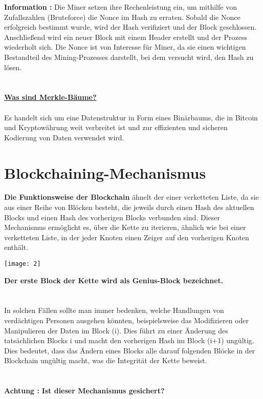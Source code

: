 \documentclass[ngerman]{scrreprt}
\begin{document}
\color{green}
\Large{\textbf{Information :}} 
\color{black}
\normalsize
Die Miner setzen ihre Rechenleistung ein, um mithilfe von Zufallszahlen (Bruteforce) die Nonce im Hash zu erraten. Sobald die Nonce erfolgreich bestimmt wurde, wird der Hash verifiziert und der Block geschlossen. Anschließend wird ein neuer Block mit einem Header erstellt und der Prozess wiederholt sich. Die Nonce ist von Interesse für Miner, da sie einen wichtigen Bestandteil des Mining-Prozesses darstellt, bei dem versucht wird, den Hash zu lösen. \\ \\ \\

\large
\underline{\textbf{Was sind Merkle-Bäume?}} \\ \\
\normalsize
Es handelt sich um eine Datenstruktur in Form eines Binärbaums, die in Bitcoin und Kryptowährung weit verbreitet ist und zur effizienten und sicheren Kodierung von Daten verwendet wird.




\section{Blockchaining-Mechanismus}
\textbf{Die Funktionsweise der Blockchain} ähnelt der einer verketteten Liste, da sie aus einer Reihe von Blöcken besteht, die jeweils durch einen Hash des aktuellen Blocks und einen Hash des vorherigen Blocks verbunden sind. Dieser Mechanismus ermöglicht es, über die Kette zu iterieren, ähnlich wie bei einer verketteten Liste, in der jeder Knoten einen Zeiger auf den vorherigen Knoten enthält.

\texttt{[image: 2]}


\textbf{Der erste Block der Kette wird als Genius-Block bezeichnet.} \\ \\ \\


In solchen Fällen sollte man immer bedenken, welche Handlungen von verdächtigen Personen ausgehen könnten, beispielsweise das Modifizieren oder Manipulieren der Daten im Block (i). Dies führt zu einer Änderung des tatsächlichen Blocks i und macht den vorherigen Hash im Block (i+1) ungültig. Dies bedeutet, dass das Ändern eines Blocks alle darauf folgenden Blöcke in der Blockchain ungültig macht, was die Integrität der Kette beweist.\\ \\ \\ 
\color{red}
\Large{\textbf{Achtung :}}
\color{black}
\textbf{Ist dieser Mechanismus gesichert?}\\ \\
\normalsize
 	
\end{document}

